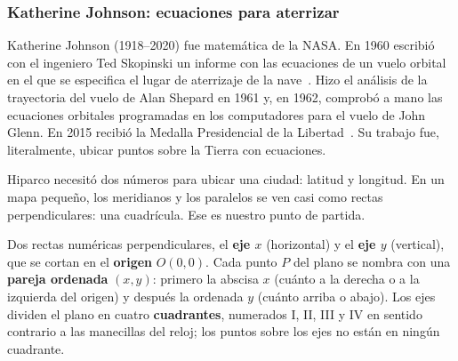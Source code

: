 \documentclass[11pt]{article}
\begin{document}
\subsubsection*{Katherine Johnson: ecuaciones para aterrizar}

Katherine Johnson (1918--2020) fue matemática de la NASA. En 1960 escribió con
el ingeniero Ted Skopinski un informe con las ecuaciones de un vuelo orbital
en el que se especifica el lugar de aterrizaje de la nave~\cite{skopinski}. Hizo
el análisis de la trayectoria del vuelo de Alan Shepard en 1961 y, en 1962,
comprobó a mano las ecuaciones orbitales programadas en los computadores para
el vuelo de John Glenn. En 2015 recibió la Medalla Presidencial de la
Libertad~\cite{nasajohnson}. Su trabajo fue, literalmente, ubicar puntos sobre la
Tierra con ecuaciones.

\label{tema:planocartesiano}

\begin{hilo}
Hiparco necesitó dos números para ubicar una ciudad: latitud y longitud. En un
mapa pequeño, los meridianos y los paralelos se ven casi como rectas
perpendiculares: una cuadrícula. Ese es nuestro punto de partida.
\end{hilo}

\begin{definicion}
Dos rectas numéricas perpendiculares, el \textbf{eje $x$} (horizontal) y el
\textbf{eje $y$} (vertical), que se cortan en el \textbf{origen} $O(0, 0)$.
Cada punto $P$ del plano se nombra con una \textbf{pareja ordenada}
$(x, y)$: primero la abscisa $x$ (cuánto a la derecha o a la izquierda del
origen) y después la ordenada $y$ (cuánto arriba o abajo). Los ejes dividen el
plano en cuatro \textbf{cuadrantes}, numerados I, II, III y IV en sentido
contrario a las manecillas del reloj; los puntos sobre los ejes no están en
ningún cuadrante.
\end{definicion}
\end{document}
